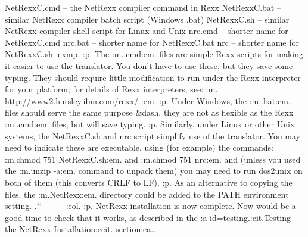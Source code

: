 NetRexxC.cmd -- the NetRexx compiler command in Rexx
NetRexxC.bat -- similar NetRexx compiler batch script (Windows .bat)
NetRexxC.sh  -- similar NetRexx compiler shell script for Linux and Unix
nrc.cmd      -- shorter name for NetRexxC.cmd
nrc.bat      -- shorter name for NetRexxC.bat
nrc          -- shorter name for NetRexxC.sh
:exmp.
:p.
The :m..cmd:em. files are simple Rexx scripts for making it easier to
use the translator.  You don't have to use these, but they save some
typing.  They should require little modification to run under the Rexx
interpreter for your platform; for details of Rexx interpreters,
see: :m.
http://www2.hursley.ibm.com/rexx/
:em.
:p.
Under Windows, the :m..bat:em. files should serve the same
purpose &dash. they are not as flexible as the Rexx :m..cmd:em. files,
but will save typing.
:p.
Similarly, under Linux or other Unix systems, the NetRexxC.sh and nrc
script simplify use of the translator.  You may need to indicate these
are executable, using (for example) the commands: :m.chmod 751
NetRexxC.sh:em. and :m.chmod 751 nrc:em. and (unless you used
the :m.unzip -a:em. command to unpack them) you may need to run dos2unix
on both of them (this converts CRLF to LF).
:p.
As an alternative to copying the files, the :m.NetRexx\bin:em. directory
could be added to the PATH environment setting.
.* - - - -
:eol.
:p.
NetRexx installation is now complete.  Now would be a good time to check
that it works, as described in the :a id=testing.:cit.Testing the NetRexx
Installation:ecit. section:ea..
